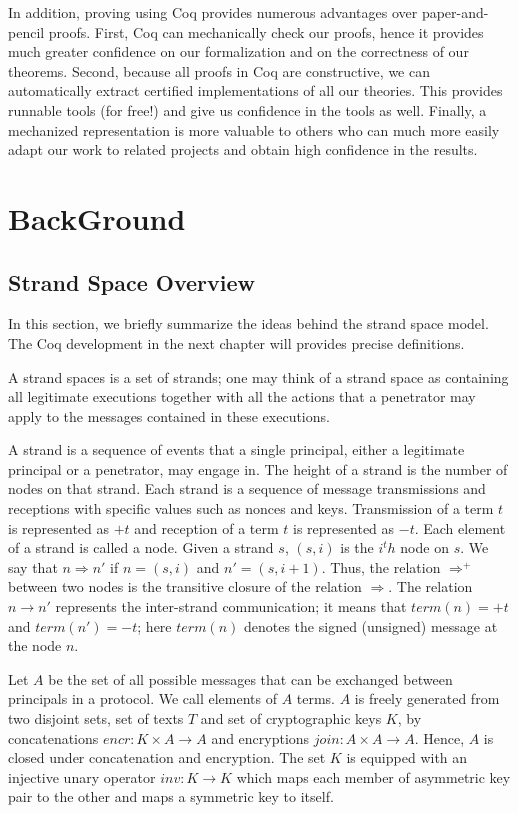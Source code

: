 In addition, proving using Coq provides numerous advantages over paper-and-pencil proofs. First, Coq can mechanically check our proofs, hence it provides much greater confidence on our formalization and on the correctness of our theorems. Second, because all proofs in Coq are constructive, we can automatically extract certified implementations of all our theories. This provides runnable tools (for free!) and give us confidence in the tools as well. Finally, a mechanized representation is more valuable to others who can much more easily
adapt our work to related projects and obtain high confidence in the results.


\chapter{BackGround}

\section{Strand Space Overview}
In this section, we briefly summarize the ideas behind the strand space model. The Coq development in the next chapter will provides precise definitions.

A strand spaces is a set of strands; one may think of a strand space as containing all legitimate executions together with all the actions that a penetrator may apply to the messages contained in these executions.

A strand is a sequence of events that a single principal, either a legitimate principal or a penetrator, may engage in. The height of a strand is the number of nodes on that strand. Each strand is a sequence of message transmissions and receptions with specific values such as nonces and keys. Transmission of a term $t$ is represented as $+t$ and reception of a term $t$ is represented as $-t$. Each element of a strand is called a node. Given a strand $s$, $(s,i)$ is the $i^th$ node on $s$. We say that $n \Rightarrow n'$ if $n=(s,i)$ and $n'=(s,i+1)$. Thus, the relation $\Rightarrow^+$ between two nodes is the transitive closure of the relation $\Rightarrow$. The relation $n \rightarrow n'$ represents the inter-strand communication; it means that $term(n)=+t$ and $term(n')=-t$; here $term(n)$ denotes the signed (unsigned) message at the node $n$.

Let $A$ be the set of all possible messages that can be exchanged between principals in a protocol. We call elements of $A$ terms. $A$ is freely generated from two disjoint sets, set of texts $T$ and set of cryptographic keys $K$, by concatenations $encr : K \times A \rightarrow A$ and encryptions $join : A \times A \rightarrow A$. Hence, $A$ is closed under concatenation and encryption. The set $K$ is equipped with an injective unary operator $inv : K \rightarrow K$ which maps each member of asymmetric key pair to the other and maps a symmetric key to itself.

